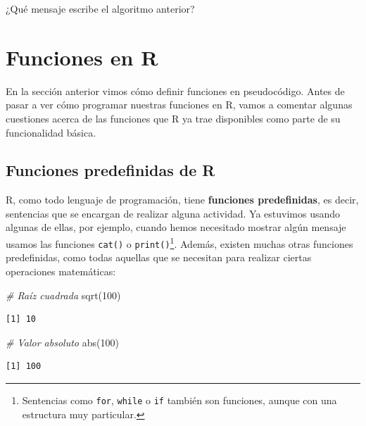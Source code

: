 \documentclass[
]{book}
\newenvironment{Shaded}{\begin{snugshade}}{\end{snugshade}}
\newcommand{\CommentTok}[1]{\textcolor[rgb]{0.56,0.35,0.01}{\textit{#1}}}
\newcommand{\DecValTok}[1]{\textcolor[rgb]{0.00,0.00,0.81}{#1}}
\newcommand{\FunctionTok}[1]{\textcolor[rgb]{0.00,0.00,0.00}{#1}}
\newcommand{\NormalTok}[1]{#1}
\begin{document}
¿Qué mensaje escribe el algoritmo anterior?

\hypertarget{funciones-en-r}{%
\section{Funciones en R}\label{funciones-en-r}}

En la sección anterior vimos cómo definir funciones en pseudocódigo. Antes de pasar a ver cómo programar nuestras funciones en R, vamos a comentar algunas cuestiones acerca de las funciones que R ya trae disponibles como parte de su funcionalidad básica.

\hypertarget{funcpredef}{%
\subsection{Funciones predefinidas de R}\label{funcpredef}}

R, como todo lenguaje de programación, tiene \textbf{funciones predefinidas}, es decir, sentencias que se encargan de realizar alguna actividad. Ya estuvimos usando algunas de ellas, por ejemplo, cuando hemos necesitado mostrar algún mensaje usamos las funciones \texttt{cat()} o \texttt{print()}\footnote{Sentencias como \texttt{for}, \texttt{while} o \texttt{if} también son funciones, aunque con una estructura muy particular.}. Además, existen muchas otras funciones predefinidas, como todas aquellas que se necesitan para realizar ciertas operaciones matemáticas:

\begin{Shaded}
\begin{Highlighting}[]
\CommentTok{\# Raíz cuadrada}
\FunctionTok{sqrt}\NormalTok{(}\DecValTok{100}\NormalTok{)}
\end{Highlighting}
\end{Shaded}

\begin{verbatim}
[1] 10
\end{verbatim}

\begin{Shaded}
\begin{Highlighting}[]
\CommentTok{\# Valor absoluto}
\FunctionTok{abs}\NormalTok{(}\DecValTok{100}\NormalTok{)}
\end{Highlighting}
\end{Shaded}

\begin{verbatim}
[1] 100
\end{verbatim}
\end{document}
